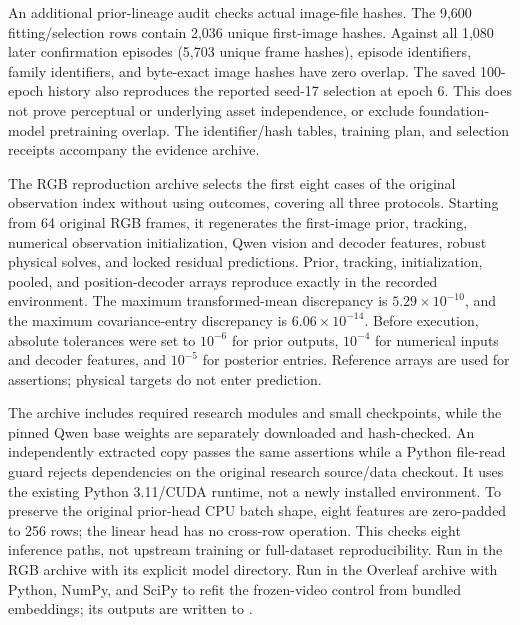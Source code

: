 An additional prior-lineage audit checks actual image-file hashes. The 9,600 fitting/selection rows contain 2,036 unique first-image hashes. Against all 1,080 later confirmation episodes (5,703 unique frame hashes), episode identifiers, family identifiers, and byte-exact image hashes have zero overlap. The saved 100-epoch history also reproduces the reported seed-17 selection at epoch 6. This does not prove perceptual or underlying asset independence, or exclude foundation-model pretraining overlap. The identifier/hash tables, training plan, and selection receipts accompany the evidence archive.

The RGB reproduction archive selects the first eight cases of the original observation index without using outcomes, covering all three protocols. Starting from 64 original RGB frames, it regenerates the first-image prior, tracking, numerical observation initialization, Qwen vision and decoder features, robust physical solves, and locked residual predictions. Prior, tracking, initialization, pooled, and position-decoder arrays reproduce exactly in the recorded environment. The maximum transformed-mean discrepancy is $5.29\times10^{-10}$, and the maximum covariance-entry discrepancy is $6.06\times10^{-14}$. Before execution, absolute tolerances were set to $10^{-6}$ for prior outputs, $10^{-4}$ for numerical inputs and decoder features, and $10^{-5}$ for posterior entries. Reference arrays are used for assertions; physical targets do not enter prediction.

The archive includes required research modules and small checkpoints, while the pinned Qwen base weights are separately downloaded and hash-checked. An independently extracted copy passes the same assertions while a Python file-read guard rejects dependencies on the original research source/data checkout. It uses the existing Python 3.11/CUDA runtime, not a newly installed environment. To preserve the original prior-head CPU batch shape, eight features are zero-padded to 256 rows; the linear head has no cross-row operation. This checks eight inference paths, not upstream training or full-dataset reproducibility. Run  in the RGB archive with its explicit model directory. Run  in the Overleaf archive with Python, NumPy, and SciPy to refit the frozen-video control from bundled embeddings; its outputs are written to .
